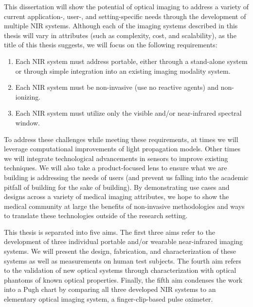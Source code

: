This dissertation will show the potential of optical imaging to address a variety of current application-, user-, and setting-specific needs through the development of multiple \ac{NIR} systems. Although each of the imaging systems described in this thesis will vary in attributes (such as complexity, cost, and scalability), as the title of this thesis suggests, we will focus on the following requirements:
\begin{enumerate}
  \item Each NIR system must address portable, either through a stand-alone system or through simple integration into an existing imaging modality system. 
  \item Each NIR system must be non-invasive (use no reactive agents) and non-ionizing.
  \item Each NIR system must utilize only the visible and/or near-infrared spectral window.
\end{enumerate}

To address these challenges while meeting these requirements, at times we will leverage computational improvements of light propagation models. Other times we will integrate technological advancements in sensors to improve existing techniques. We will also take a product-focused lens to ensure what we are building is addressing the needs of users (and prevent us falling into the academic pitfall of building for the sake of building). By demonstrating use cases and designs across a variety of medical imaging attributes, we hope to show the medical community at large the benefits of non-invasive methodologies and ways to translate these technologies outside of the research setting. 

This thesis is separated into five aims. The first three aims refer to the development of three individual portable and/or wearable near-infrared imaging systems. We will present the design, fabrication, and characterization of these systems as well as measurements on human test subjects. The fourth aim refers to the validation of new optical systems through characterization with optical phantoms of known optical properties. Finally, the fifth aim condenses the work into a Pugh chart by comparing all three developed NIR systems to an elementary optical imaging system, a finger-clip-based pulse oximeter. 

